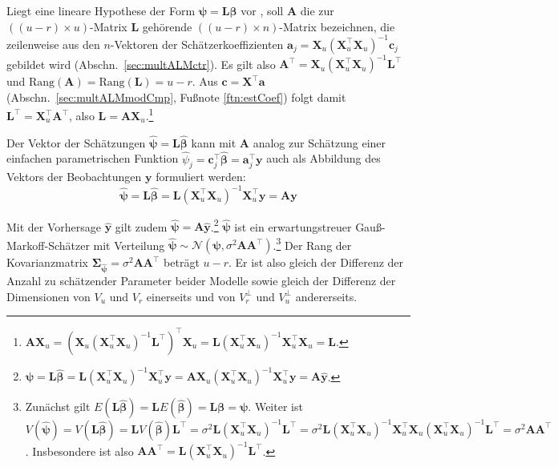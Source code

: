 Liegt eine lineare Hypothese der Form $\bm{\psi} = \bm{L} \bm{\beta}$ vor \cite{Fox2013}, soll $\bm{A}$ die zur $((u-r) \times u)$-Matrix $\bm{L}$ gehörende $((u-r) \times n)$-Matrix bezeichnen, die zeilenweise aus den $n$-Vektoren der Schätzerkoeffizienten $\bm{a}_{j} = \bm{X}_{u} (\bm{X}_{u}^{\top} \bm{X}_{u})^{-1} \bm{c}_{j}$ gebildet wird (Abschn.\ \ref{sec:multALMctr}). Es gilt also $\bm{A}^{\top} = \bm{X}_{u} (\bm{X}_{u}^{\top} \bm{X}_{u})^{-1} \bm{L}^{\top}$ und $\text{Rang}(\bm{A}) = \text{Rang}(\bm{L}) = u-r$. Aus $\bm{c} = \bm{X}^{\top} \bm{a}$ (Abschn.\ \ref{sec:multALMmodCmp}, Fußnote \ref{ftn:estCoef}) folgt damit $\bm{L}^{\top} = \bm{X}_{u}^{\top} \bm{A}^{\top}$, also $\bm{L} = \bm{A} \bm{X}_{u}$.\footnote{$\bm{A} \bm{X}_{u} = (\bm{X}_{u} (\bm{X}_{u}^{\top} \bm{X}_{u})^{-1} \bm{L}^{\top})^{\top} \bm{X}_{u} = \bm{L} (\bm{X}_{u}^{\top} \bm{X}_{u})^{-1} \bm{X}_{u}^{\top} \bm{X}_{u} = \bm{L}$.}

Der Vektor der Schätzungen $\hat{\bm{\psi}} = \bm{L} \hat{\bm{\beta}}$ kann mit $\bm{A}$ analog zur Schätzung einer einfachen parametrischen Funktion $\hat{\psi}_{j} = \bm{c}_{j}^{\top} \hat{\bm{\beta}} = \bm{a}_{j}^{\top} \bm{y}$ auch als Abbildung des Vektors der Beobachtungen $\bm{y}$ formuliert werden:
\begin{equation*}
\hat{\bm{\psi}} = \bm{L} \hat{\bm{\beta}} = \bm{L} (\bm{X}_{u}^{\top} \bm{X}_{u})^{-1} \bm{X}_{u}^{\top} \bm{y} = \bm{A} \bm{y}
\end{equation*}

Mit der Vorhersage $\hat{\bm{y}}$ gilt zudem $\hat{\bm{\psi}} = \bm{A} \hat{\bm{y}}$.\footnote{\label{ftn:estCoeffMat}$\hat{\bm{\psi}} = \bm{L} \hat{\bm{\beta}} = \bm{L} (\bm{X}_{u}^{\top} \bm{X}_{u})^{-1} \bm{X}_{u}^{\top} \bm{y} = \bm{A} \bm{X}_{u} (\bm{X}_{u}^{\top} \bm{X}_{u})^{-1} \bm{X}_{u}^{\top} \bm{y} = \bm{A} \hat{\bm{y}}$.} $\hat{\bm{\psi}}$ ist ein erwartungstreuer Gauß-Markoff-Schätzer mit Verteilung $\hat{\bm{\psi}} \sim \bm{\mathcal{N}}(\bm{\psi}, \sigma^{2} \bm{A} \bm{A}^{\top})$.\footnote{\label{ftn:varPsiHat}Zunächst gilt $E(\bm{L} \hat{\bm{\beta}}) = \bm{L} E(\hat{\bm{\beta}}) = \bm{L} \bm{\beta} = \bm{\psi}$. Weiter ist $V(\hat{\bm{\psi}}) = V(\bm{L} \hat{\bm{\beta}}) = \bm{L} V(\hat{\bm{\beta}}) \bm{L}^{\top} = \sigma^{2} \bm{L} (\bm{X}_{u}^{\top} \bm{X}_{u})^{-1} \bm{L}^{\top} = \sigma^{2} \bm{L} (\bm{X}_{u}^{\top} \bm{X}_{u})^{-1} \bm{X}_{u}^{\top} \bm{X}_{u} (\bm{X}_{u}^{\top} \bm{X}_{u})^{-1} \bm{L}^{\top} = \sigma^{2} \bm{A} \bm{A}^{\top}$. Insbesondere ist also $\bm{A} \bm{A}^{\top} = \bm{L} (\bm{X}_{u}^{\top} \bm{X}_{u})^{-1} \bm{L}^{\top}$.} Der Rang der Kovarianzmatrix $\bm{\Sigma}_{\hat{\bm{\psi}}} = \sigma^{2} \bm{A} \bm{A}^{\top}$ beträgt $u-r$. Er ist also gleich der Differenz der Anzahl zu schätzender Parameter beider Modelle sowie gleich der Differenz der Dimensionen von $V_{u}$ und $V_{r}$ einerseits und von $V_{r}^{\perp}$ und $V_{u}^{\perp}$ andererseits.

